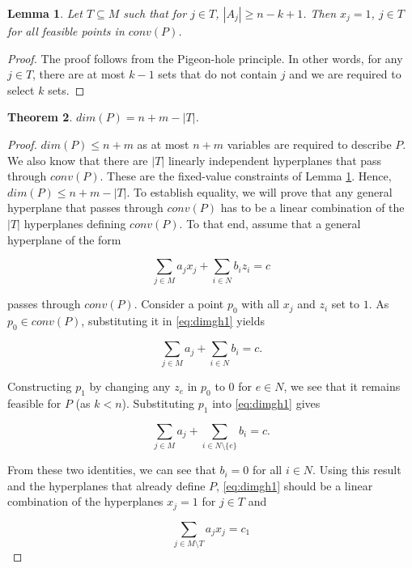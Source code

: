 \documentclass[12pt]{article}
\newtheorem{thm}{Theorem}
\newtheorem{lem}[thm]{Lemma}
\begin{document}
\begin{lem} \label{lem:php}
Let $T \subseteq M$ such that for $j \in T$, $|A_j| \geq n-k+1$. Then $x_j=1$, $j \in T$ for all feasible points in $conv(P)$.
\end{lem}

\begin{proof}
The proof follows from the Pigeon-hole principle. In other words, for any $j \in T$, there are at most $k-1$ sets that do not contain $j$ and we are required to select $k$ sets.
\end{proof}

\begin{thm} \label{thm:dim}
$dim(P) = n + m - |T|$.
\end{thm}

\begin{proof}
$dim(P) \leq n+m$ as at most $n+m$ variables are required to describe $P$. We also know that there are $|T|$ linearly independent hyperplanes that pass through $conv(P)$. These are the fixed-value constraints of Lemma \ref{lem:php}. Hence, $dim(P) \leq n + m - |T|$. To establish equality, we will prove that any general hyperplane that passes through $conv(P)$ has to be a linear combination of the $|T|$ hyperplanes defining $conv(P)$. To that end, assume that a general hyperplane of the form

\begin{equation} \label{eq:dimgh1}
\sum_{j \in M} a_j x_j + \sum_{i \in N} b_i z_i = c
\end{equation}

passes through $conv(P)$. Consider a point $p_0$ with all $x_j$ and $z_i$ set to $1$. As $p_0 \in conv(P)$, substituting it in \eqref{eq:dimgh1} yields

\[\sum_{j \in M} a_j + \sum_{i \in N} b_i = c.\]

Constructing $p_1$ by changing any $z_e$ in $p_0$ to $0$ for $e \in N$, we see that it remains feasible for $P$ (as $k < n$). Substituting $p_1$ into \eqref{eq:dimgh1} gives

\[\sum_{j \in M} a_j + \sum_{i \in N \setminus \{e\}} b_i = c.\]

From these two identities, we can see that $b_i = 0$ for all $i \in N$. Using this result and the hyperplanes that already define $P$, \eqref{eq:dimgh1} should be a linear combination of the hyperplanes $x_j = 1$ for $j \in T$ and

\begin{equation} \label{eq:dimgh2}
\sum_{j \in M \setminus T} a_j x_j = c_1
\end{equation}


\end{proof}
\end{document}
